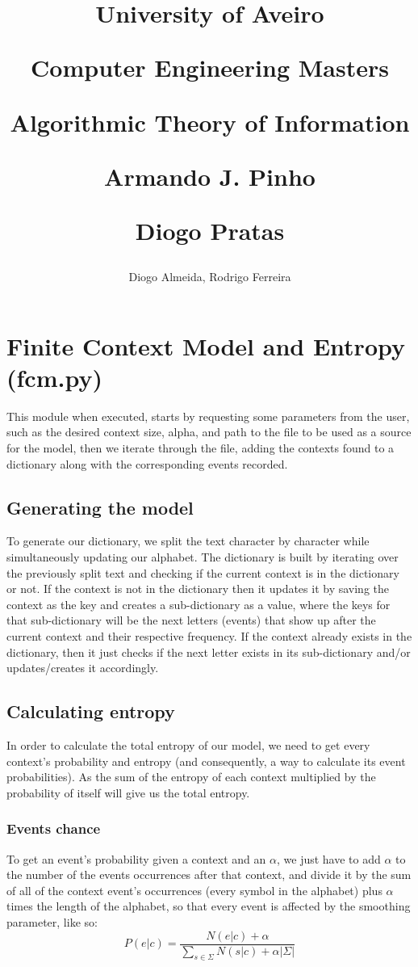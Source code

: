 \documentclass{article}
\title{University of Aveiro 

Computer Engineering Masters 

Algorithmic Theory of Information 

 

Armando J. Pinho 

Diogo Pratas }
\author{Diogo Almeida, Rodrigo Ferreira}
\begin{document}
    \maketitle
    \newpage
    \section{Finite Context Model and Entropy (fcm.py)}
		This module when executed, starts by requesting some parameters from the user, such as the desired context size, alpha, and path to the file to be used as a source for the model, then we iterate through the file, adding the contexts found to a dictionary along with the corresponding events recorded. 
	\subsection{Generating the model}
		To generate our dictionary, we split the text character by character while simultaneously updating our alphabet. The dictionary is built by iterating over the previously split text and checking if the current context is in the dictionary or not. If the context is not in the dictionary then it updates it by saving the context as the key and creates a sub-dictionary as a value, where the keys for that sub-dictionary will be the next letters (events) that show up after the current context and their respective frequency. If the context already exists in the dictionary, then it just checks if the next letter exists in its sub-dictionary and/or updates/creates it accordingly. 
	\subsection{Calculating entropy}
		In order to calculate the total entropy of our model, we need to get every context's probability and entropy (and consequently, a way to calculate its event probabilities). As the sum of the entropy of each context multiplied by the probability of itself will give us the total entropy.
	\subsubsection{Events chance}
		To get an event's probability given a context and an $\alpha$, we just have to add $\alpha$ to the number of the events occurrences after that context, and divide it by the sum of all of the context event's occurrences (every symbol in the alphabet) plus $\alpha$ times the length of the alphabet, so that every event is affected by the smoothing parameter, like so:  
	\[P(e|c) = \frac{N(e|c) + \alpha}{\displaystyle \sum_{s \in \Sigma}{N(s|c)} + \alpha|\Sigma|}\]
\end{document}
